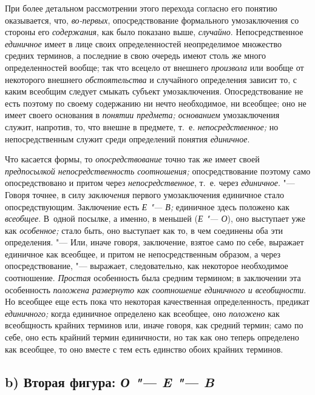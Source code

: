 При более детальном рассмотрении этого перехода согласно его
понятию оказывается, что, {\em во-первых},
опосредствование формального умозаключения со стороны его
{\em содержания}, как было показано выше, {\em случайно}.
Непосредственное {\em единичное} имеет в
лице своих определенностей неопределимое множество средних терминов, а
последние в свою очередь имеют столь же много определенностей вообще; так
что всецело от внешнего {\em произвола}
или вообще от некоторого внешнего {\em обстоятельства} и
случайного определения зависит то, с каким всеобщим следует смыкать субъект
умозаключения. Опосредствование не есть поэтому по своему содержанию ни
нечто необходимое, ни всеобщее; оно не имеет своего основания в
{\em понятии предмета; основанием}
умозаключения служит, напротив, то, что внешне в предмете,
т.~е. {\em непосредственное;}
но непосредственным служит среди определений понятия {\em единичное}.

Что касается формы, то {\em опосредствование} точно так же имеет своей
{\em предпосылкой непосредственность
соотношения;} опосредствование поэтому само опосредствовано
и притом через {\em непосредственное}, т.~е. через {\em единичное}. "--- Говоря
точнее, в силу {\em заключения}
первого умозаключения единичное стало опосредствующим.
Заключение есть {\em Е "--- В;} единичное здесь положено как
{\em всеобщее}. В~одной посылке, а именно, в меньшей ({\em Е "--- О}),
оно выступает уже как {\em особенное;} стало
быть, оно выступает как то, в чем соединены оба эти определения. "---
Или, иначе говоря, заключение, взятое само по себе, выражает
единичное как всеобщее, и притом не непосредственным образом, а через
опосредствование, "--- выражает, следовательно, как некоторое
необходимое соотношение. {\em Простая}
особенность была средним термином; в заключении эта
особенность {\em положена развернуто как
соотношение единичного и всеобщности}. Но всеобщее еще есть
пока что некоторая качественная определенность, предикат
{\em единичного;} когда единичное определено как всеобщее, оно
{\em положено} как
всеобщность крайних терминов или, иначе говоря, как средний термин; само по
себе, оно есть крайний термин единичности, но так как оно теперь определено
как всеобщее, то оно вместе с тем есть единство обоих крайних терминов.

\subsection[b) Вторая фигура]
{b) Вторая фигура: {\em О "--- E "--- B}}

